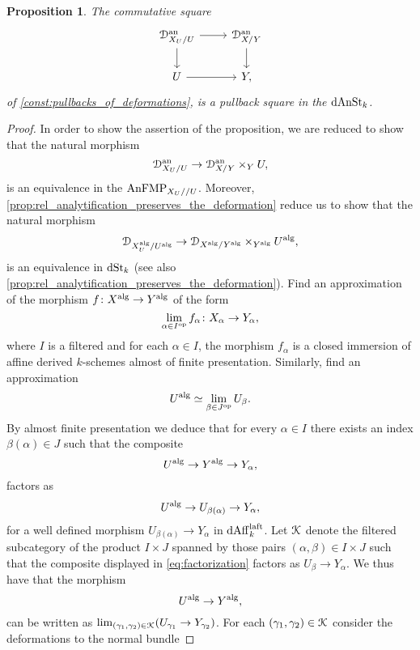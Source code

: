 \documentclass[10pt,a4paper,reqno]{amsart} %
\theoremstyle{plain}
\newtheorem{prop}[thm]{Proposition}
\theoremstyle{definition}
\theoremstyle{remark}
\numberwithin{equation}{section}
\begin{document}
\begin{prop} \label{prop:gluing_the_deformation}
    The commutative square
        \[
        \begin{tikzcd}
            \cD_{X_U/ U}\an \ar{r} \ar{d} & \cD_{X/ Y} \an \ar{d} \\
            U \ar{r} & Y, 
        \end{tikzcd}
        \]
    of \cref{const:pullbacks_of_deformations}, is a pullback square in the \infcat $\mathrm{dAnSt}_k$.
\end{prop}

\begin{proof}
    In order to show the assertion of the proposition, we are reduced to show that the natural morphism
        \[
            \mathcal D_{X_U/ U}^\mathrm{an} \to \mathcal D^\mathrm{an}_{X/ Y} \times_Y U,  
        \]
    is an equivalence in the \infcat $\mathrm{AnFMP}_{X_U/ /U}$. Moreover, \cref{prop:rel_analytification_preserves_the_deformation} reduce us
    to show that the natural morphism
        \[
            \mathcal D_{X_U^\mathrm{alg}/ U^\mathrm{alg}} \to \mathcal D_{X^\mathrm{alg}/ Y^\mathrm{alg}} \times_{Y^\mathrm{alg}}U^\mathrm{alg},
        \]
    is an equivalence in $\mathrm{dSt}_k$ (see also \cref{prop:rel_analytification_preserves_the_deformation}). Find an approximation of the morphism $f \colon X ^\mathrm{alg} \to Y^\mathrm{alg}$
    of the form
        \[
            \lim_{\alpha \in I^\mathrm{op}} f_\alpha \colon X_\alpha \to Y_\alpha,  
        \]
    where $I$ is a filtered \infcat and for each $\alpha \in I$, the morphism $f_\alpha$ is a closed immersion of affine derived $k$-schemes
    almost of finite presentation. Similarly, find an approximation
        \[
            U ^\mathrm{alg} \simeq \lim_{\beta \in J^\mathrm{op}} U_\beta.  
        \]
    By almost finite presentation we deduce that for every $\alpha \in I$ there exists an index $\beta(\alpha) \in J$ such that the composite
        \begin{equation} \label{eq:factorization}
             U^\mathrm{alg} \to Y^\mathrm{alg} \to Y_\alpha,
        \end{equation}
    factors as 
        \[U^\mathrm{alg} \to U_{\beta(\alpha)} \to Y_\alpha,\]
    for a well defined morphism $U_{\beta(\alpha)} \to Y_\alpha$ in $\mathrm{dAff}_k^{\mathrm{laft}}$.
    Let $\mathcal K$ denote the filtered subcategory of the product $I \times J$ spanned by those pairs $(\alpha, \beta) \in I \times J$
    such that the composite displayed in \eqref{eq:factorization} factors as $U_\beta \to Y_\alpha$. We thus have that the morphism
        \[
            U ^\mathrm{alg} \to Y^\mathrm{alg} ,  
        \]
    can be written as $\lim_{(\gamma_1, \gamma_2) \in \mathcal K} (U_{\gamma_1} \to Y_{\gamma_2})$. For each $(\gamma_1, \gamma_2) \in \mathcal K$ consider the deformations to the normal bundle

\end{proof}
\end{document}
